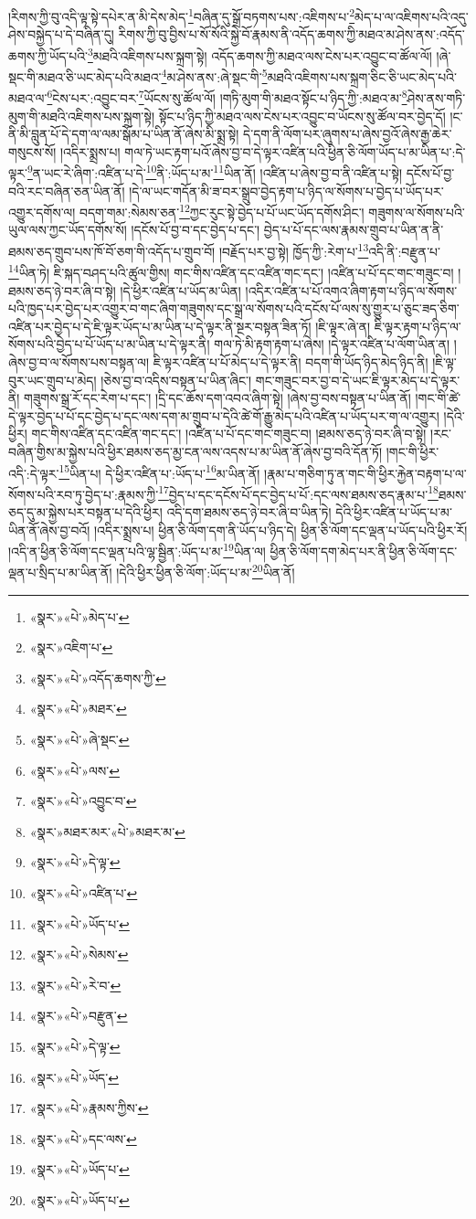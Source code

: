 །རིགས་ཀྱི་བུ་འདི་ལྟ་སྟེ་དཔེར་ན་མི་དེས་མེད་\footnote{«སྣར་»«པེ་»མེད་པ་}བཞིན་དུ་སྒྲོ་བཏགས་པས་:འཇིགས་པ་\footnote{«སྣར་»འཇིག་པ་}མེད་པ་ལ་འཇིགས་པའི་འདུ་ཤེས་བསྐྱེད་པ་དེ་བཞིན་དུ། རིགས་ཀྱི་བུ་བྱིས་པ་སོ་སོའི་སྐྱེ་བོ་རྣམས་ནི་འདོད་ཆགས་ཀྱི་མཐའ་མ་ཤེས་ནས་:འདོད་ཆགས་ཀྱི་ཡོད་པའི་\footnote{«སྣར་»«པེ་»འདོད་ཆགས་ཀྱི་}མཐའི་འཇིགས་པས་སྐྲག་སྟེ། འདོད་ཆགས་ཀྱི་མཐའ་ལས་ངེས་པར་འབྱུང་བ་ཚོལ་ལོ། །ཞེ་སྡང་གི་མཐའ་ཅི་ཡང་མེད་པའི་མཐའ་\footnote{«སྣར་»«པེ་»མཐར་}མ་ཤེས་ནས་:ཞེ་སྡང་གི་\footnote{«སྣར་»«པེ་»ཞེ་སྡང་}མཐའི་འཇིགས་པས་སྐྲག་ཅིང་ཅི་ཡང་མེད་པའི་མཐའ་ལ་\footnote{«སྣར་»«པེ་»ལས་}ངེས་པར་:འབྱུང་བར་\footnote{«སྣར་»«པེ་»འབྱུང་བ་}ཡོངས་སུ་ཚོལ་ལོ། །གཏི་མུག་གི་མཐའ་སྟོང་པ་ཉིད་ཀྱི་:མཐའ་མ་\footnote{«སྣར་»མཐར་མར་«པེ་»མཐར་མ་}ཤེས་ནས་གཏི་མུག་གི་མཐའི་འཇིགས་པས་སྐྲག་སྟེ། སྟོང་པ་ཉིད་ཀྱི་མཐའ་ལས་ངེས་པར་འབྱུང་བ་ཡོངས་སུ་ཚོལ་བར་བྱེད་དོ། །ང་ནི་མི་བླུན་པོ་དེ་དག་ལ་ལམ་སྒོམ་པ་ཡིན་ནོ་ཞེས་མི་སྨྲ་སྟེ། དེ་དག་ནི་ལོག་པར་ཞུགས་པ་ཞེས་བྱའོ་ཞེས་རྒྱ་ཆེར་གསུངས་སོ། །འདིར་སྨྲས་པ། གལ་ཏེ་ཡང་རྟག་པའོ་ཞེས་བྱ་བ་དེ་ལྟར་འཛིན་པའི་ཕྱིན་ཅི་ལོག་ཡོད་པ་མ་ཡིན་པ་:དེ་ལྟར་\footnote{«སྣར་»«པེ་»དེ་ལྟ་}ན་ཡང་རེ་ཞིག་:འཛིན་པ་དེ་\footnote{«སྣར་»«པེ་»འཛིན་པ་}ནི་:ཡོད་པ་མ་\footnote{«སྣར་»«པེ་»ཡོད་པ་}ཡིན་ནོ། །འཛིན་པ་ཞེས་བྱ་བ་ནི་འཛིན་པ་སྟེ། དངོས་པོ་བྱ་བའི་རང་བཞིན་ཅན་ཡིན་ནོ། །དེ་ལ་ཡང་གདོན་མི་ཟ་བར་སྒྲུབ་བྱེད་རྟག་པ་ཉིད་ལ་སོགས་པ་བྱེད་པ་ཡོད་པར་འགྱུར་དགོས་ལ། བདག་གམ་:སེམས་ཅན་\footnote{«སྣར་»«པེ་»སེམས་}ཀྱང་རུང་སྟེ་བྱེད་པ་པོ་ཡང་ཡོད་དགོས་ཤིང་། གཟུགས་ལ་སོགས་པའི་ཡུལ་ལས་ཀྱང་ཡོད་དགོས་སོ། །དངོས་པོ་བྱ་བ་དང་བྱེད་པ་དང་། བྱེད་པ་པོ་དང་ལས་རྣམས་གྲུབ་པ་ཡིན་ན་ནི་ཐམས་ཅད་གྲུབ་པས་ཁོ་བོ་ཅག་གི་འདོད་པ་གྲུབ་བོ། །བརྗོད་པར་བྱ་སྟེ། ཁྱོད་ཀྱི་:རེག་པ་\footnote{«སྣར་»«པེ་»རེ་བ་}འདི་ནི་:བརྫུན་པ་\footnote{«སྣར་»«པེ་»བརྫུན་}ཡིན་ཏེ། ཇི་སྐད་བཤད་པའི་ཚུལ་གྱིས། གང་གིས་འཛིན་དང་འཛིན་གང་དང་། །འཛིན་པ་པོ་དང་གང་གཟུང་བ། །ཐམས་ཅད་ཉེ་བར་ཞི་བ་སྟེ། །དེ་ཕྱིར་འཛིན་པ་ཡོད་མ་ཡིན། །འདིར་འཛིན་པ་པོ་འགའ་ཞིག་རྟག་པ་ཉིད་ལ་སོགས་པའི་ཁྱད་པར་བྱེད་པར་འགྱུར་བ་གང་ཞིག་གཟུགས་དང་སྒྲ་ལ་སོགས་པའི་དངོས་པོ་ལས་སུ་གྱུར་པ་ཅུང་ཟད་ཅིག་འཛིན་པར་བྱེད་པ་དེ་ཇི་ལྟར་ཡོད་པ་མ་ཡིན་པ་དེ་ལྟར་ནི་སྔར་བསྟན་ཟིན་ཏོ། །ཇི་ལྟར་ཞེ་ན། ཇི་ལྟར་རྟག་པ་ཉིད་ལ་སོགས་པའི་བྱེད་པ་པོ་ཡོད་པ་མ་ཡིན་པ་དེ་ལྟར་ནི། གལ་ཏེ་མི་རྟག་རྟག་པ་ཞེས། །དེ་ལྟར་འཛིན་པ་ལོག་ཡིན་ན། །ཞེས་བྱ་བ་ལ་སོགས་པས་བསྟན་ལ། ཇི་ལྟར་འཛིན་པ་པོ་མེད་པ་དེ་ལྟར་ནི། བདག་གི་ཡོད་ཉིད་མེད་ཉིད་ནི། །ཇི་ལྟ་བུར་ཡང་གྲུབ་པ་མེད། །ཅེས་བྱ་བ་འདིས་བསྟན་པ་ཡིན་ཞིང་། གང་གཟུང་བར་བྱ་བ་དེ་ཡང་ཇི་ལྟར་མེད་པ་དེ་ལྟར་ནི། གཟུགས་སྒྲ་རོ་དང་རེག་པ་དང་། །དྲི་དང་ཆོས་དག་འབའ་ཞིག་སྟེ། །ཞེས་བྱ་བས་བསྟན་པ་ཡིན་ནོ། །གང་གི་ཚེ་དེ་ལྟར་བྱེད་པ་པོ་དང་བྱེད་པ་དང་ལས་དག་མ་གྲུབ་པ་དེའི་ཚེ་གོ་རྒྱུ་མེད་པའི་འཛིན་པ་ཡོད་པར་ག་ལ་འགྱུར། །དེའི་ཕྱིར། གང་གིས་འཛིན་དང་འཛིན་གང་དང་། །འཛིན་པ་པོ་དང་གང་གཟུང་བ། །ཐམས་ཅད་ཉེ་བར་ཞི་བ་སྟེ། །རང་བཞིན་གྱིས་མ་སྐྱེས་པའི་ཕྱིར་ཐམས་ཅད་མྱ་ངན་ལས་འདས་པ་མ་ཡིན་ནོ་ཞེས་བྱ་བའི་དོན་ཏོ། །གང་གི་ཕྱིར་འདི་:དེ་ལྟར་\footnote{«སྣར་»«པེ་»དེ་ལྟ་}ཡིན་པ། དེ་ཕྱིར་འཛིན་པ་:ཡོད་པ་\footnote{«སྣར་»«པེ་»ཡོད་}མ་ཡིན་ནོ། །རྣམ་པ་གཅིག་ཏུ་ན་གང་གི་ཕྱིར་རྐྱེན་བརྟག་པ་ལ་སོགས་པའི་རབ་ཏུ་བྱེད་པ་:རྣམས་ཀྱི་\footnote{«སྣར་»«པེ་»རྣམས་ཀྱིས་}བྱེད་པ་དང་དངོས་པོ་དང་བྱེད་པ་པོ་:དང་ལས་ཐམས་ཅད་རྣམ་པ་\footnote{«སྣར་»«པེ་»དང་ལས་}ཐམས་ཅད་དུ་མ་སྐྱེས་པར་བསྟན་པ་དེའི་ཕྱིར། འདི་དག་ཐམས་ཅད་ཉེ་བར་ཞི་བ་ཡིན་ཏེ། དེའི་ཕྱིར་འཛིན་པ་ཡོད་པ་མ་ཡིན་ནོ་ཞེས་བྱ་བའོ། །འདིར་སྨྲས་པ། ཕྱིན་ཅི་ལོག་དག་ནི་ཡོད་པ་ཉིད་དེ། ཕྱིན་ཅི་ལོག་དང་ལྡན་པ་ཡོད་པའི་ཕྱིར་རོ། །འདི་ན་ཕྱིན་ཅི་ལོག་དང་ལྡན་པའི་ལྷ་སྦྱིན་:ཡོད་པ་མ་\footnote{«སྣར་»«པེ་»ཡོད་པ་}ཡིན་ལ། ཕྱིན་ཅི་ལོག་དག་མེད་པར་ནི་ཕྱིན་ཅི་ལོག་དང་ལྡན་པ་སྲིད་པ་མ་ཡིན་ནོ། །དེའི་ཕྱིར་ཕྱིན་ཅི་ལོག་:ཡོད་པ་མ་\footnote{«སྣར་»«པེ་»ཡོད་པ་}ཡིན་ནོ། 